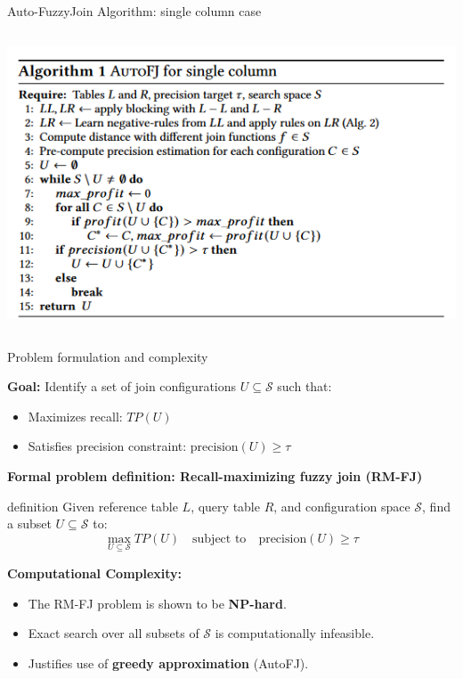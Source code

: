 \documentclass[8pt]{beamer} %
\begin{document}
\begin{frame}{Auto-FuzzyJoin Algorithm: single column case}
\begin{columns}
		\begin{column}{0.45\textwidth}
			\centering
			\includegraphics[width=\linewidth]{img/autofj-algorithm.png}
		\end{column}
	\end{columns}
\end{frame}

\begin{frame}{Problem formulation and complexity}
	
	\textbf{Goal:} Identify a set of join configurations $U \subseteq \mathcal{S}$ such that:
	\begin{itemize}
		\item Maximizes recall: $TP(U)$
		\item Satisfies precision constraint: $\text{precision}(U) \geq \tau$
	\end{itemize}
	
	\vspace{1em}
	\textbf{Formal problem definition: Recall-maximizing fuzzy join (RM-FJ)} \\
		
	\begin{beamercolorbox}[rounded=true, shadow=true, leftskip=1em, rightskip=1em]{definition}
		Given reference table $L$, query table $R$, and configuration space $\mathcal{S}$, find a subset $U \subseteq \mathcal{S}$ to:
		$$
		\max_{U \subseteq \mathcal{S}} TP(U) \quad \text{subject to} \quad \text{precision}(U) \geq \tau
		$$
	\end{beamercolorbox}
	
	\vspace{1em}
	\textbf{Computational Complexity:}
	\begin{itemize}
		\item The RM-FJ problem is shown to be \textbf{NP-hard}.
		\item Exact search over all subsets of $\mathcal{S}$ is computationally infeasible.
		\item Justifies use of \textbf{greedy approximation} (AutoFJ).
	\end{itemize}
	
\end{frame}
\end{document}

